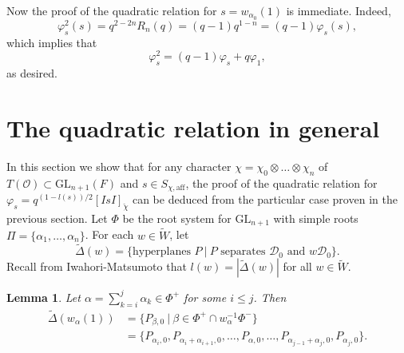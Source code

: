 \documentclass{article}
\newcommand{\GL}{\mathrm{GL}}
\newcommand{\aff}{\mathrm{aff}}
\newcommand{\calpha}{\check{\alpha}}
\newcommand{\cO}{\mathcal{O}}
\theoremstyle{plain}
\newtheorem{lemma}[theorem]{Lemma}
\theoremstyle{definition}
\begin{document}
    Now the proof of the quadratic relation for $s=w_{\alpha_0}(1)$ is immediate. Indeed,
    $$\varphi_s^2(s)=q^{2-2n}R_n(q)=(q-1)q^{1-n}=(q-1)\varphi_s(s),$$
    which implies that $$\varphi_s^2=(q-1)\varphi_s+q\varphi_1,$$
    as desired.
    \newpage

    \section{The quadratic relation in general}

    In this section we show that for any character $\chi=\chi_0\otimes\ldots\otimes\chi_n$ of $T(\cO)\subset\GL_{n+1}(F)$ and $s\in S_{\chi,\aff}$, the proof of the quadratic relation for $\varphi_s=q^{(1-l(s))/2}[IsI]_{\check{\chi}}$ can be deduced from the particular case proven in the previous section. Let $\Phi$ be the root system for $\GL_{n+1}$ with simple roots $\Pi=\{\alpha_1,\ldots,\alpha_n\}$. For each $w\in\tilde{W}$, let 
    $$\widetilde{\Delta}(w)=\{\text{hyperplanes }P\ |\ P\text{ separates }\mathcal{D}_0\text{ and }w\mathcal{D}_0\}.$$
    Recall from Iwahori-Matsumoto that $l(w)=|\widetilde{\Delta}(w)|$ for all $w\in\tilde{W}$.

    \begin{lemma}\label{lem_w1}
        Let $\alpha=\sum_{k=i}^{j}\alpha_k\in\Phi^+$ for some $i\leq j$. Then
        \begin{align*}
            \widetilde{\Delta}(w_\alpha(1))&=\{P_{\beta,0}\ |\ \beta\in\Phi^+\cap w_\alpha^{-1}\Phi^-\}\\
            &=\{P_{\alpha_i,0},P_{\alpha_i+\alpha_{i+1},0},\ldots,P_{\alpha,0},\ldots,P_{\alpha_{j-1}+\alpha_j,0},P_{\alpha_j,0}\}.
        \end{align*}
    \end{lemma}
\end{document}
